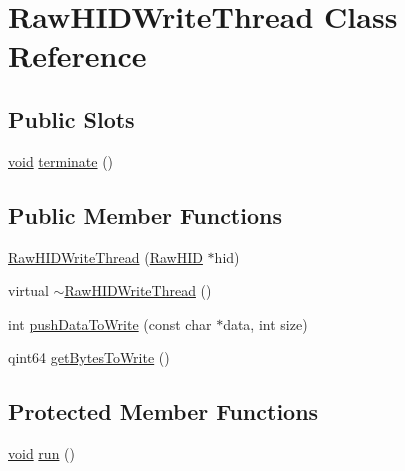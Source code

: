 \hypertarget{class_raw_h_i_d_write_thread}{\section{\-Raw\-H\-I\-D\-Write\-Thread \-Class \-Reference}
\label{class_raw_h_i_d_write_thread}
}
\subsection*{\-Public \-Slots}
\begin{DoxyCompactItemize}
\item 
\hyperlink{group___u_a_v_objects_plugin_ga444cf2ff3f0ecbe028adce838d373f5c}{void} \hyperlink{group___raw_h_i_d_plugin_gaf92ea93cbc5d6c7672f8853d3e761122}{terminate} ()
\end{DoxyCompactItemize}
\subsection*{\-Public \-Member \-Functions}
\begin{DoxyCompactItemize}
\item 
\hyperlink{group___raw_h_i_d_plugin_gac9c8ee05f180a569c664780b9760849e}{\-Raw\-H\-I\-D\-Write\-Thread} (\hyperlink{class_raw_h_i_d}{\-Raw\-H\-I\-D} $\ast$hid)
\item 
virtual \hyperlink{group___raw_h_i_d_plugin_gaf760c0fa4d7799e982c74e1b6aaba378}{$\sim$\-Raw\-H\-I\-D\-Write\-Thread} ()
\item 
int \hyperlink{group___raw_h_i_d_plugin_ga563f2214706aafbf75b158b6ca2ed73e}{push\-Data\-To\-Write} (const char $\ast$data, int size)
\item 
qint64 \hyperlink{group___raw_h_i_d_plugin_ga33316914e9994a7ee878bffe07175781}{get\-Bytes\-To\-Write} ()
\end{DoxyCompactItemize}
\subsection*{\-Protected \-Member \-Functions}
\begin{DoxyCompactItemize}
\item 
\hyperlink{group___u_a_v_objects_plugin_ga444cf2ff3f0ecbe028adce838d373f5c}{void} \hyperlink{group___raw_h_i_d_plugin_gaac9f3dfe020b10edc1c5677e07b36d04}{run} ()
\end{DoxyCompactItemize}
